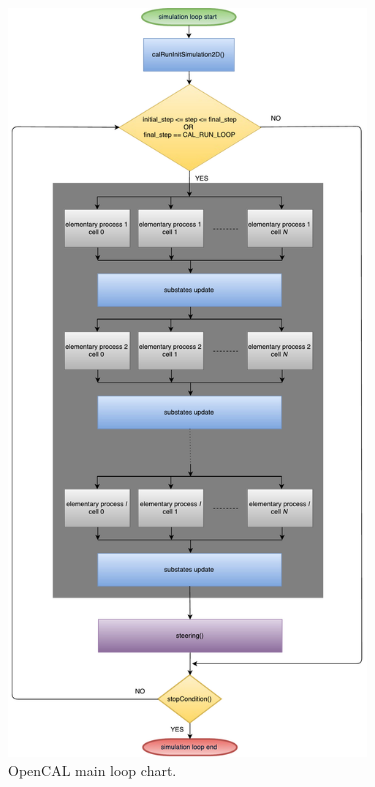 \begin{figure}[htbp]
  \centering
  \includegraphics[width=9.5cm]{./images/OpenCAL/opencal_main_loop.pdf}
  \caption{OpenCAL main loop chart.}
  \label{fig:opencal_main_loop}
\end{figure}


